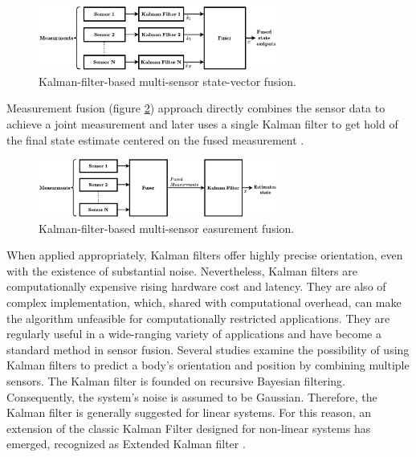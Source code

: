 \begin{figure}[!h]
    \centering
    \includegraphics[width=0.7\textwidth]{figures/kalman1.pdf}
    \caption{Kalman-filter-based multi-sensor state-vector fusion. \cite{mosallaei2007process}}
    \label{fig:state_kalman}
\end{figure}

Measurement fusion (figure \ref{fig:mesearurment_kalman}) approach directly combines the sensor data to achieve a joint measurement and later uses a single Kalman filter to get hold of the final state estimate centered on the fused measurement \cite{mosallaei2007process}.

\begin{figure}[!h]
    \centering
    \includegraphics[width=0.7\textwidth]{figures/kalman2.pdf}
    \caption{Kalman-filter-based multi-sensor easurement fusion. \cite{mosallaei2007process}}
    \label{fig:mesearurment_kalman}
\end{figure}

When applied appropriately, Kalman filters offer highly precise orientation, even with the existence of substantial noise. Nevertheless, Kalman filters are computationally expensive rising hardware cost and latency. They are also of complex implementation, which, shared with computational overhead, can make the algorithm unfeasible for computationally restricted applications. They are regularly useful in a wide-ranging variety of applications and have become a standard method in sensor fusion. Several studies examine the possibility of using Kalman filters to predict a body's orientation and position by combining multiple sensors. The Kalman filter is founded on recursive Bayesian filtering.
Consequently, the system's noise is assumed to be Gaussian. Therefore, the Kalman filter is generally suggested for linear systems. For this reason, an extension of the classic Kalman Filter designed for non-linear systems has emerged, recognized as Extended Kalman filter \cite{wilson2019formulation}.

